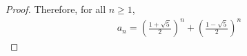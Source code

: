 \documentclass{article}
\begin{document}
\begin{enumerate}
\begin{proof}
    Therefore, for all $n \geq 1$,
    \begin{gather}
        a_n = \left(\frac{1 + \sqrt{5}}{2}\right)^n + \left(\frac{1 - \sqrt{5}}{2}\right)^n
    \end{gather}
\end{proof}

\end{enumerate}
\end{document}
